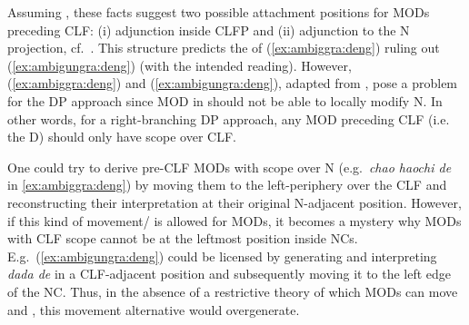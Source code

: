 \documentclass[output=paper,colorlinks,citecolor=brown]{langscibook}
\begin{document}
\noindent  Assuming  \citep[cf.][8]{MyP&Mueller21a}, these facts suggest two possible attachment positions for MODs preceding CLF: (i) adjunction inside CLFP and (ii) adjunction to the N projection, cf.\ .  This structure predicts the  of (\ref{ex:ambiggra:deng}) ruling out (\ref{ex:ambigungra:deng}) (with the intended reading).  However, (\ref{ex:ambiggra:deng}) and (\ref{ex:ambigungra:deng}), adapted from \citet[7]{Zhang11a}, pose a problem for the DP approach since MOD in  should not be able to locally modify N. In other words, for a right-branching DP approach, any MOD preceding CLF (i.e. the D) should only have scope over CLF. %
%
	
One could try to derive pre-CLF MODs with scope over N (e.g.\  \textit{chao haochi de} in \ref{ex:ambiggra:deng}) by moving them to the left-periphery over the CLF and reconstructing their interpretation at their original N-adjacent position. However,  if this kind of movement/ is allowed for MODs, it becomes a mystery why  MODs with CLF scope cannot be at the leftmost position inside NCs. E.g.\  (\ref{ex:ambigungra:deng}) could be licensed by  generating and interpreting  \textit{dada de} in a CLF-adjacent position and subsequently moving it to the left edge of the NC. Thus, in the absence of a restrictive theory of which MODs can move and , this movement alternative would overgenerate.%


\settowidth{} 
 \label{ex:ambiggra:deng}
 \label{ex:ambigungra:deng}
	
\end{document}
